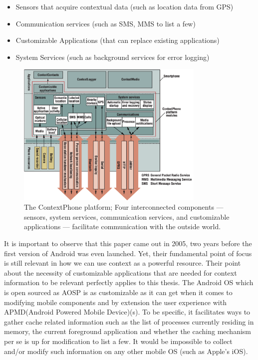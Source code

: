 \documentclass[12pt]{uthesis-v12}  %
\begin{document}
		\begin{itemize}
			\item Sensors that acquire contextual data (such as location data from GPS)
			\item Communication services (such as SMS, MMS to list a few)
			\item Customizable Applications (that can replace existing applications)
			\item System Services (such as background services for error logging)
		\end{itemize}
		
		
		\begin{figure}[!ht]
			\centering
			\includegraphics[width = 90mm]{images/contextPhone.png}
			\caption[Context Phone]
			{The ContextPhone platform; Four interconnected components — sensors, system services, communication services, and customizable applications — facilitate communication with the outside world.}
		\end{figure}
		
		It is important to observe that this paper came out in 2005, two years before the first version of Android was even launched. Yet, their fundamental point of focus is still relevant in how we can use context as a powerful resource. Their point about the necessity of customizable applications that are needed for context information to be relevant perfectly applies to this thesis. The Android OS which is open sourced as AOSP is as customizable as it can get when it comes to modifying mobile components and by extension the user experience with APMD(Android Powered Mobile Device)(s). To be specific, it facilitates ways to gather cache related information such as the list of processes currently residing in memory, the current foreground application and whether the caching mechanism per se is up for modification to list a few. It would be impossible to collect and/or modify such information on any other mobile OS (such as Apple's iOS).
		
\end{document}

